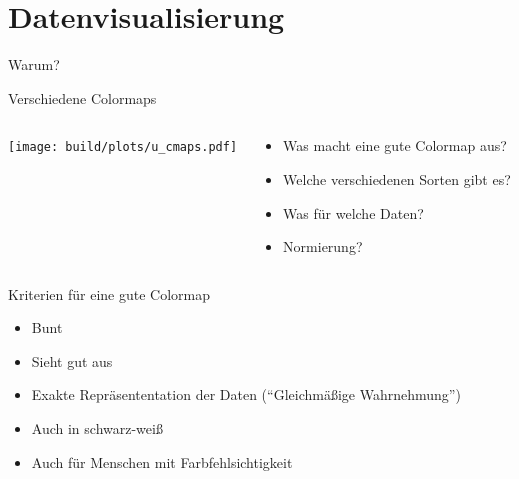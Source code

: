 \documentclass[aspectratio=1610, 9pt]{beamer}
\begin{document}
\section{Datenvisualisierung}

\begin{frame}[t]{Warum?}
\end{frame}

\begin{frame}[t]{Verschiedene Colormaps}
  \begin{columns}[onlytextwidth]%
    \begin{column}{0.52\textwidth}%
      \texttt{[image: build/plots/u\_cmaps.pdf]}
    \end{column}%
    \hfill%
    \begin{column}{0.47\textwidth}%
      \begin{itemize}
        \item Was macht eine gute Colormap aus?
        \item Welche verschiedenen Sorten gibt es?
        \item Was für welche Daten?
        \item Normierung?
      \end{itemize}
    \end{column}%
  \end{columns}%
\end{frame}

\begin{frame}{Kriterien für eine gute Colormap}
  \begin{itemize}
    \item Bunt
    \item Sieht gut aus\\[2\baselineskip]
    \item Exakte Repräsententation der Daten (\enquote{Gleichmäßige Wahrnehmung})
    \item Auch in schwarz-weiß 
    \item Auch für Menschen mit Farbfehlsichtigkeit
  \end{itemize}
\end{frame}
\end{document}
